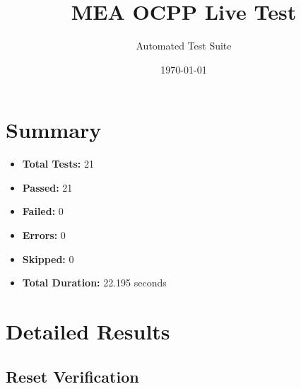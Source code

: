 \documentclass{article}
\title{MEA OCPP Live Test}
\author{Automated Test Suite}
\date{\today}
\begin{document}
\maketitle

\section{Summary}
\begin{itemize}
    \item \textbf{Total Tests:} 21
    \item \textbf{Passed:} 21
    \item \textbf{Failed:} 0
    \item \textbf{Errors:} 0
    \item \textbf{Skipped:} 0
    \item \textbf{Total Duration:} 22.195 seconds
\end{itemize}

\section{Detailed Results}
\subsection{Reset Verification}
\end{document}
